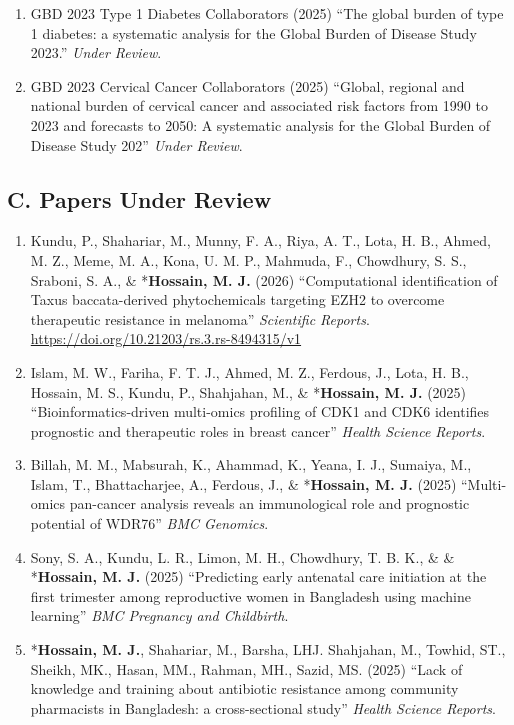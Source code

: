 \documentclass[
  11pt,
  letterpaper,
  DIV=11,
  numbers=noendperiod]{scrartcl}
\providecommand{\tightlist}{%
  \setlength{\itemsep}{0pt}\setlength{\parskip}{0pt}}
\begin{document}
\begin{enumerate}
  pandemic of COVID-19'' \emph{BMC Medicine (Under Review)}.\\
\item
  GBD 2023 Type 1 Diabetes Collaborators (2025) ``The global burden of
  type 1 diabetes: a systematic analysis for the Global Burden of
  Disease Study 2023.'' \emph{Under Review}.\\
\item
  GBD 2023 Cervical Cancer Collaborators (2025) ``Global, regional and
  national burden of cervical cancer and associated risk factors from
  1990 to 2023 and forecasts to 2050: A systematic analysis for the
  Global Burden of Disease Study 202'' \emph{Under Review}.
\end{enumerate}

\subsection{C. Papers Under Review}\label{c.-papers-under-review}

\begin{enumerate}
\def\labelenumi{\arabic{enumi}.}
\tightlist
\item
  Kundu, P., Shahariar, M., Munny, F. A., Riya, A. T., Lota, H. B.,
  Ahmed, M. Z., Meme, M. A., Kona, U. M. P., Mahmuda, F., Chowdhury, S.
  S., Sraboni, S. A., \& *\textbf{Hossain, M. J.} (2026) ``Computational
  identification of Taxus baccata-derived phytochemicals targeting EZH2
  to overcome therapeutic resistance in melanoma'' \emph{Scientific
  Reports}.
  \href{https://doi.org/https://doi.org/10.21203/rs.3.rs-8494315/v1}{https://doi.org/10.21203/rs.3.rs-8494315/v1}\\
\item
  Islam, M. W., Fariha, F. T. J., Ahmed, M. Z., Ferdous, J., Lota, H.
  B., Hossain, M. S., Kundu, P., Shahjahan, M., \& *\textbf{Hossain, M.
  J.} (2025) ``Bioinformatics-driven multi-omics profiling of CDK1 and
  CDK6 identifies prognostic and therapeutic roles in breast cancer''
  \emph{Health Science Reports}.\\
\item
  Billah, M. M., Mabsurah, K., Ahammad, K., Yeana, I. J., Sumaiya, M.,
  Islam, T., Bhattacharjee, A., Ferdous, J., \& *\textbf{Hossain, M. J.}
  (2025) ``Multi-omics pan-cancer analysis reveals an immunological role
  and prognostic potential of WDR76'' \emph{BMC Genomics}.\\
\item
  Sony, S. A., Kundu, L. R., Limon, M. H., Chowdhury, T. B. K., \& \&
  *\textbf{Hossain, M. J.} (2025) ``Predicting early antenatal care
  initiation at the first trimester among reproductive women in
  Bangladesh using machine learning'' \emph{BMC Pregnancy and
  Childbirth}.\\
\item
  *\textbf{Hossain, M. J.}, Shahariar, M., Barsha, LHJ. Shahjahan, M.,
  Towhid, ST., Sheikh, MK., Hasan, MM., Rahman, MH., Sazid, MS. (2025)
  ``Lack of knowledge and training about antibiotic resistance among
  community pharmacists in Bangladesh: a cross-sectional study''
  \emph{Health Science Reports}.
\end{enumerate}
\end{document}
